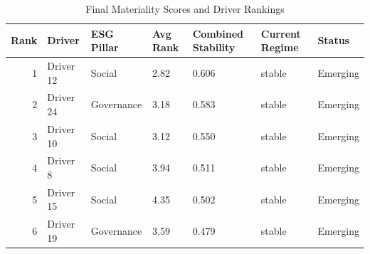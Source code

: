 \begin{table}
\caption{Final Materiality Scores and Driver Rankings}
\label{tab:final_materiality}
\begin{tabular}{rllllll}
\toprule
Rank & Driver & ESG Pillar & Avg Rank & Combined Stability & Current Regime & Status \\
\midrule
1 & Driver 12 & Social & 2.82 & 0.606 & stable & Emerging \\
2 & Driver 24 & Governance & 3.18 & 0.583 & stable & Emerging \\
3 & Driver 10 & Social & 3.12 & 0.550 & stable & Emerging \\
4 & Driver 8 & Social & 3.94 & 0.511 & stable & Emerging \\
5 & Driver 15 & Social & 4.35 & 0.502 & stable & Emerging \\
6 & Driver 19 & Governance & 3.59 & 0.479 & stable & Emerging \\
\bottomrule
\end{tabular}
\end{table}
